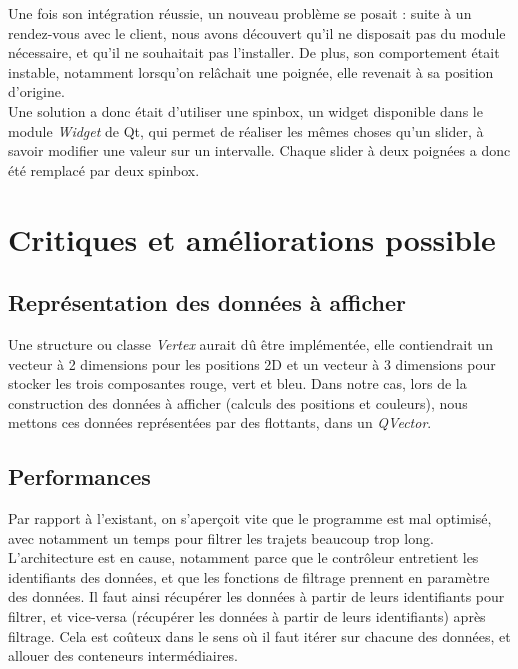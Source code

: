 \documentclass[12pt]{article}
\begin{document}
		Une fois son intégration réussie, un nouveau problème se posait : suite à un rendez-vous avec le client, nous avons découvert qu’il ne disposait pas du module nécessaire, et qu’il ne souhaitait pas l’installer. De plus, son comportement était instable, notamment lorsqu’on relâchait une poignée, elle revenait à sa position d’origine.\\
	
		Une solution a donc était d’utiliser une spinbox, un widget disponible dans le module \textit{Widget} de Qt, qui permet de réaliser les mêmes choses qu’un slider, à savoir modifier une valeur sur un intervalle. Chaque slider à deux poignées a donc été remplacé par deux spinbox.
	
	\newpage
	\section{Critiques et améliorations possible} \label{ameliorations}	
		\subsection{Représentation des données à afficher} 
		Une structure ou classe \textit{Vertex} aurait dû être implémentée, elle contiendrait un vecteur
		à 2 dimensions pour les positions 2D et un vecteur à 3 dimensions pour stocker les trois
		composantes rouge, vert et bleu.
		Dans notre cas,
		lors de la construction des données à afficher (calculs des positions et couleurs), nous
		mettons ces données représentées par des flottants, dans un \textit{QVector}.
	
		\subsection{Performances}
		Par rapport à l’existant, on s'aperçoit vite que le programme est mal optimisé, avec notamment un temps pour filtrer les trajets beaucoup trop long.\\
	
		L’architecture est en cause, notamment parce que le contrôleur entretient les identifiants des données, et que les fonctions de filtrage prennent en paramètre des données. Il faut ainsi récupérer les données à partir de leurs identifiants pour filtrer, et vice-versa (récupérer les données à partir de leurs identifiants) après filtrage. Cela est coûteux dans le sens où il faut itérer sur chacune des données, et allouer des conteneurs intermédiaires.\\
		
\end{document}
